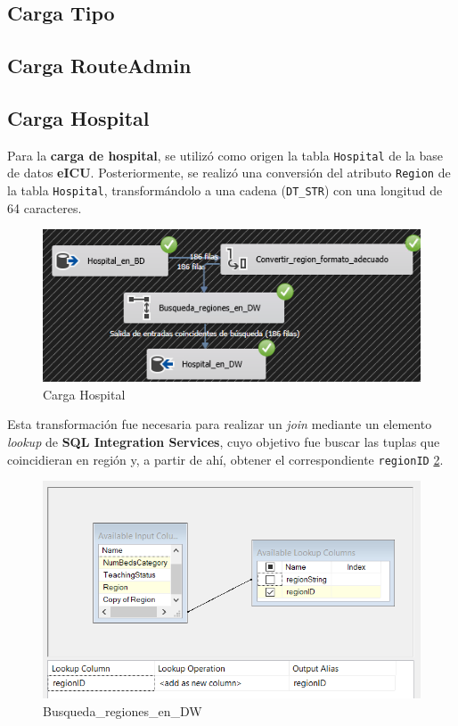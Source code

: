 \documentclass[12pt, a4paper, twoside]{article}
\begin{document}
	\subsection{Carga Tipo}
	
	\subsection{Carga RouteAdmin}
	
	\subsection{Carga Hospital}
	
	Para la \textbf{carga de hospital}, se utilizó como origen la tabla \texttt{Hospital} de la base de datos \textbf{eICU}. Posteriormente, se realizó una conversión del atributo \texttt{Region} de la tabla \texttt{Hospital}, transformándolo a una cadena (\texttt{DT\_STR}) con una longitud de 64 caracteres. 
	
	\begin{figure}[H]
		\centering
		\includegraphics[width=1\textwidth]{image/105_cargahospital.png}
		\caption{Carga Hospital}
		\label{fig:16}
	\end{figure}
	
	Esta transformación fue necesaria para realizar un \textit{join} mediante un elemento \textit{lookup} de \textbf{SQL Integration Services}, cuyo objetivo fue buscar las tuplas que coincidieran en región y, a partir de ahí, obtener el correspondiente \texttt{regionID} \ref{fig:22}.
	
	\begin{figure}[H]
		\centering
		\includegraphics[width=1\textwidth]{image/105_cargahospital_lookup.png}
		\caption{Busqueda\_regiones\_en\_DW}
		\label{fig:22}
	\end{figure}
\end{document}

